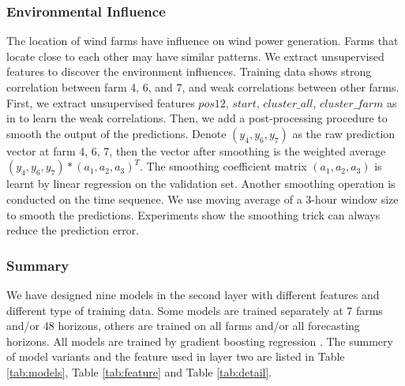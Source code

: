 \documentclass[conference]{IEEEtran}
\begin{document}
\subsubsection{Environmental Influence}
The location of wind farms have influence on wind power generation. Farms that locate close to each other may have similar patterns. We extract unsupervised features to discover the environment influences. Training data shows strong correlation between farm 4, 6, and 7, and weak correlations between other farms. First, we extract unsupervised features $pos12$, $start$, $cluster\_all$, $cluster\_farm$ as in \cite{SILVA2014395} to learn the weak correlations. Then, we add a post-processing procedure to smooth the output of the predictions. Denote $(y_4, y_6, y_7)$ as the raw prediction vector at farm 4, 6, 7, then the vector after smoothing is the weighted average $(y_4, y_6, y_7)*(a_1,a_2,a_3)^T$. The smoothing coefficient matrix $(a_1,a_2,a_3)$ is learnt by linear regression on the validation set. Another smoothing operation is conducted on the time sequence. We use moving average of a 3-hour window size to smooth the predictions. Experiments show the smoothing trick can always reduce the prediction error.

\subsubsection{Summary}
We have designed nine models in the second layer with different features and different type of training data. Some models are trained separately at 7 farms and/or 48 horizons, others are trained on all farms and/or all forecasting horizons. All models are trained by gradient boosting regression \cite{DBLP:journals/corr/ChenG16}. The summery of model variants and the feature used in layer two are listed in Table \ref{tab:models}, Table \ref{tab:feature} and Table \ref{tab:detail}.
\begin{table}[h]
\caption {Prediction Models in the Second Layer}
\begin{center}
\label{tab:models}
\end{center}
\vspace*{-1mm}
\end{table}
\end{document}
